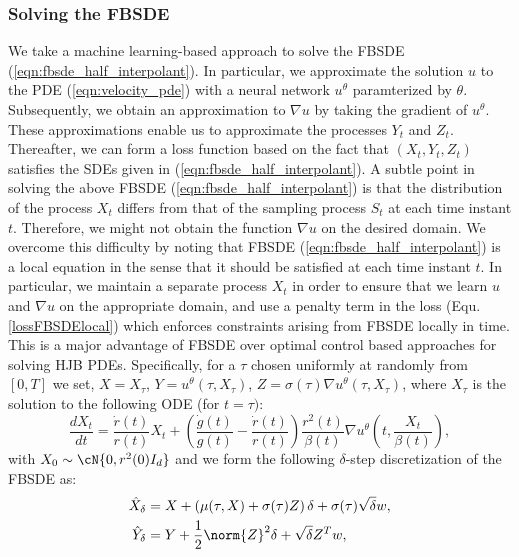 \subsubsection{Solving the FBSDE}\label{sec:solving_fbsde}
We take a machine learning-based approach to solve the FBSDE (\ref{eqn:fbsde_half_interpolant}). In particular, we approximate the solution $u$ to the PDE (\ref{eqn:velocity_pde}) with a neural network $u^\theta$ paramterized by $\theta$. Subsequently, we obtain an approximation to $\nabla u$ by taking the gradient of $u^\theta$. These approximations enable us to approximate the processes $Y_t$ and $Z_t$. Thereafter, we can form a loss function based on the fact that $(X_t,Y_t,Z_t)$ satisfies the SDEs given in (\ref{eqn:fbsde_half_interpolant}). A subtle point in solving the above FBSDE (\ref{eqn:fbsde_half_interpolant}) is that the distribution of the process $X_t$ differs from that of the sampling process $S_t$ at each time instant $t$. Therefore, we might not obtain the function $\nabla u$ on the desired domain. We overcome this difficulty by noting that FBSDE (\ref{eqn:fbsde_half_interpolant}) is a local equation in the sense that it should be satisfied at each time instant $t$. In particular, we maintain a separate process $X_t$ in order to ensure that we learn $u$ and $\nabla u$ on the appropriate domain, and use a penalty term in the loss (Equ. \eqref{lossFBSDElocal}) which enforces constraints arising from FBSDE locally in time. This is a major advantage of FBSDE over optimal control based approaches for solving HJB PDEs.  Specifically, for a $\tau$ chosen uniformly at randomly from $[0,T]$ we set, $X=X_\tau$, 
$Y=u^\theta(\tau,X_\tau)$, $Z=\sigma(\tau)\nabla u^\theta(\tau,X_\tau)$, where $X_\tau$ is the solution to the following ODE (for $t=\tau)$:
\begin{equation}\label{eqn:fbsde_init_process}
    \frac{dX_t}{dt} = \frac{\dot r(t)}{r(t)}X_t+\left(\frac{\dot g(t)}{g(t)}-\frac{\dot r(t)}{r(t)}\right)\frac{r^2(t)}{\beta(t)}\nabla u^\theta\left(t,\frac{X_t}{\beta(t)}\right),
\end{equation}
with $X_0\sim\cN{0,r^2(0)I_d}$ and we 
form the following $\delta$-step discretization of the FBSDE as:
\begin{align}\label{eqn:fbsde_discretized_half_int}
\begin{split}
        \hat{X}_\delta &= X + \left(\mu(\tau,X)+\sigma(\tau)Z\right)\delta+\sigma(\tau)\sqrt{\delta}w,\\
       \hat{Y}_\delta &= Y + \frac{1}{2}\norm{Z}^2\delta+\sqrt{\delta}Z^Tw,
\end{split}
\end{align}
